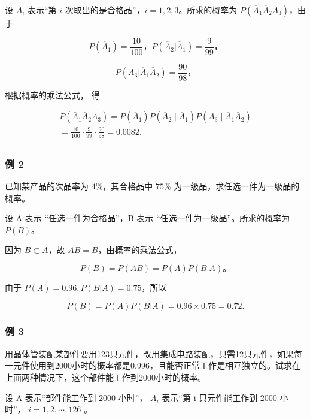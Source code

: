  设 \(A_{i}\) 表示``第 \(i\)
次取出的是合格品''，\(i = 1, 2, 3\)。所求的概率为
\(P(\overline{A}_1\overline{A}_2A_3)\)，由于

\[
P (\overline {{{A}}} _ {1}) = \frac {10}{100}\text{，} P (\overline {{{A}}} _ {2} | \overline {{{A}}} _ {1}) = \frac {9}{99}\text{，}
\]

\[
P (A _ {3} | \overline {{{A}}} _ {1} \overline {{{A}}} _ {2}) = \frac {90}{98}\text{，}
\]

根据概率的乘法公式， 得

\[
\begin{array}{l} P \left(\overline {{{A}}} _ {1} \overline {{{A}}} _ {2} A _ {3}\right) = P \left(\overline {{{A}}} _ {1}\right) P \left(\overline {{{A}}} _ {2} \mid \overline {{{A}}} _ {1}\right) P \left(A _ {3} \mid \overline {{{A}}} _ {1} \overline {{{A}}} _ {2}\right) \\ = \frac {10}{100} \cdot \frac {9}{99} \cdot \frac {90}{98} = 0.0082. \\ \end{array}
\]

\subsubsection{例 2}

已知某产品的次品率为 \(4\%\)，其合格品中 \(75\%\)
为一级品，求任选一件为一级品的概率。

 设 A 表示 ``任选一件为合格品''，B 表示
``任选一件为一级品''。所求的概率为 \(P(B)\)。

因为 \(B \subset A\)，故 \(AB = B\)，由概率的乘法公式，

\[
P (B) = P (A B) = P (A) P (B | A)\text{。}
\]

由于 \(P(A) = 0.96, P(B|A) = 0.75\)，所以

\[
P (B) = P (A) P (B | A) = 0.96 \times 0.75 = 0.72.
\]

\subsubsection{例 3}

用晶体管装配某部件要用123只元件，改用集成电路装配，只需12只元件，如果每一元件使用到2000小时的概率都是0.996，且能否正常工作是相互独立的。试求在上面两种情况下，这个部件能工作到2000小时的概率。

 设 A 表示``部件能工作到 2000 小时''， \(A_{i}\) 表示``第
i 只元件能工作到 2000 小时''， \(i=1,2,\cdots,126\) 。

